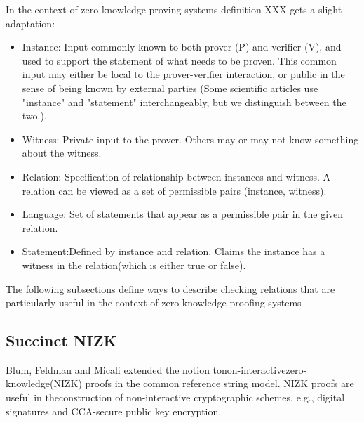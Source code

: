 In the context of zero knowledge proving systems definition XXX gets a slight adaptation:
\begin{itemize}
\item Instance: Input commonly known to both prover (P) and verifier (V), and used to support the statement of what needs to be proven. This common input may either be local to the prover-verifier interaction, or public in the sense of being known by external parties (Some scientific articles use "instance" and "statement" interchangeably, but we distinguish between the two.).
\item Witness: Private input to the prover. Others may or may not know something about the witness.
\item Relation: Specification of relationship between instances and witness. A relation can be viewed as a set of permissible pairs (instance, witness).
\item Language: Set of statements that appear as a permissible pair in the given relation.
\item Statement:Defined by instance and relation. Claims the instance has a witness in the relation(which is either true or false).
\end{itemize}

The following subsections define ways to describe checking relations that are particularly useful in the context of zero knowledge proofing systems

\subsection{Succinct NIZK}
Blum, Feldman and Micali
 extended the notion tonon-interactivezero-knowledge(NIZK)  proofs in the  common  reference  string  model.  NIZK  proofs  are  useful  in  theconstruction of non-interactive cryptographic schemes, e.g., digital signatures and CCA-secure public key encryption.
 
